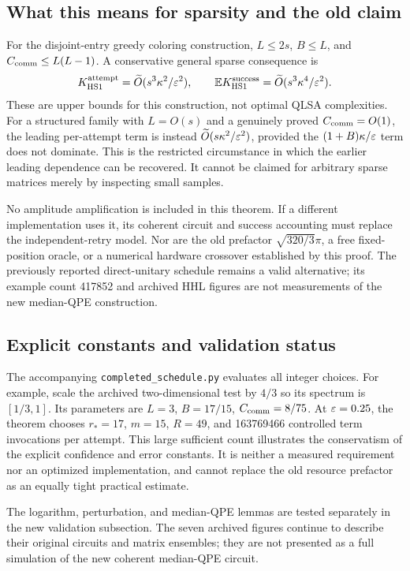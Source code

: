 \subsection{What this means for sparsity and the old claim}
For the disjoint-entry greedy coloring construction, $L\leq2s$, $B\leq L$, and $C_{\mathrm{comm}}\leq L(L-1)$. A conservative general sparse consequence is
\begin{equation}
 K_{\mathrm{HS1}}^{\rm attempt}=\widetilde O(s^3\kappa^2/\varepsilon^2),\qquad
 \mathbb EK_{\mathrm{HS1}}^{\rm success}=\widetilde O(s^3\kappa^4/\varepsilon^2).
\end{equation}
These are upper bounds for this construction, not optimal QLSA complexities. For a structured family with $L=O(s)$ and a genuinely proved $C_{\mathrm{comm}}=O(1)$, the leading per-attempt term is instead $\widetilde O(s\kappa^2/\varepsilon^2)$, provided the $(1+B)\kappa/\varepsilon$ term does not dominate. This is the restricted circumstance in which the earlier leading dependence can be recovered. It cannot be claimed for arbitrary sparse matrices merely by inspecting small samples.

No amplitude amplification is included in this theorem. If a different implementation uses it, its coherent circuit and success accounting must replace the independent-retry model. Nor are the old prefactor $\sqrt{320/3}\pi$, a free fixed-position oracle, or a numerical hardware crossover established by this proof. The previously reported direct-unitary schedule remains a valid alternative; its example count 417852 and archived HHL figures are not measurements of the new median-QPE construction.

\subsection{Explicit constants and validation status}
The accompanying \texttt{completed\_schedule.py} evaluates all integer choices. For example, scale the archived two-dimensional test by $4/3$ so its spectrum is $[1/3,1]$. Its parameters are $L=3$, $B=17/15$, $C_{\mathrm{comm}}=8/75$. At $\varepsilon=0.25$, the theorem chooses $r_*=17$, $m=15$, $R=49$, and 163769466 controlled term invocations per attempt. This large sufficient count illustrates the conservatism of the explicit confidence and error constants. It is neither a measured requirement nor an optimized implementation, and cannot replace the old resource prefactor as an equally tight practical estimate.

The logarithm, perturbation, and median-QPE lemmas are tested separately in the new validation subsection. The seven archived figures continue to describe their original circuits and matrix ensembles; they are not presented as a full simulation of the new coherent median-QPE circuit.
